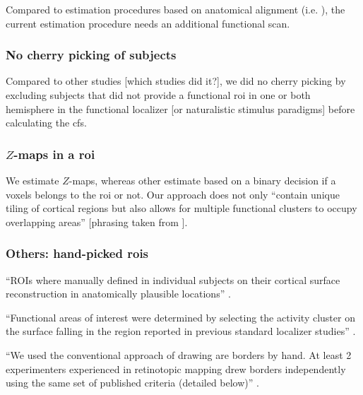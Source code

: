 
%
Compared to estimation procedures based on anatomical alignment (i.e.
\citep{weiner2018defining}), the current estimation procedure needs an
additional functional scan.


\subsubsection{No cherry picking of subjects}


%
Compared to other studies [which studies did it?], we did no cherry picking by
excluding subjects that did not provide a functional \ac{roi} in one or both
hemisphere in the functional localizer [or naturalistic stimulus paradigms]
before calculating the \ac{cfs}.


\subsubsection{$Z$-maps in a \ac{roi}}




%
We estimate $Z$-maps, whereas other estimate based on a binary decision if a
voxels belongs to the \ac{roi} or not.
%
Our approach does not only ``contain unique tiling of cortical regions
but also allows for multiple functional clusters to occupy overlapping
areas'' [phrasing taken from \citet{rosenke2021probabilistic}].


\subsubsection{Others: hand-picked \acp{roi}}

%
``ROIs where manually defined in individual subjects on their cortical surface
reconstruction in anatomically plausible locations''
\citep{rosenke2021probabilistic}.

%
``Functional areas of interest were determined by selecting the activity cluster
on the surface falling in the region reported in previous standard localizer
studies'' \citep{frost2012measuring}.

%
``We used the conventional approach of drawing are borders by hand.
%
At least 2 experimenters experienced in retinotopic mapping drew borders
independently using the same set of published criteria (detailed below)''
\citep{wang2015probabilistic}.

